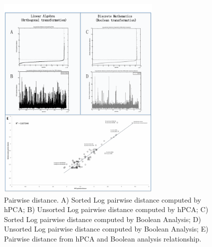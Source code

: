 \documentclass[12pt]{article}
\begin{document}
\begin{figure}
%
\begin{center}
%
\includegraphics[width=0.7\textwidth]{Pairwise_distance.pdf}
%
\caption{\label{fig:distance}Pairwise distance.  A) Sorted Log pairwise distance computed by hPCA; B) Unsorted Log pairwise distance computed by hPCA; C) Sorted Log pairwise distance computed by Boolean Analysis; D) Unsorted Log pairwise distance computed by Boolean Analysis; E) Pairwise distance from hPCA and Boolean analysis relationship. }
%
\end{center}
\end{figure}
\end{document}
